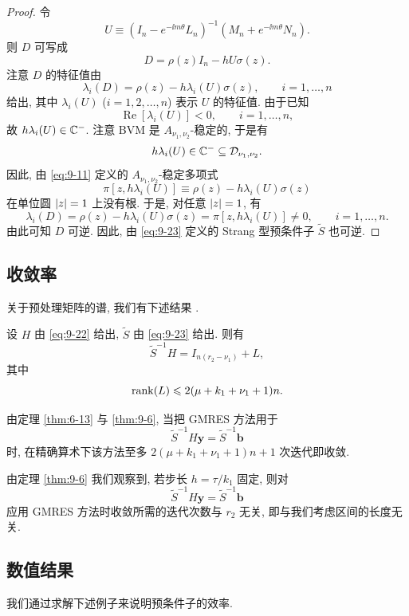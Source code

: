 \begin{proof}
令
\[
  U\equiv(I_n-e^{-\ii m\theta}L_n)^{-1}(M_n+e^{-\ii m\theta}N_n).
\]
则 $D$ 可写成
\[
  D=\rho(z)I_n-hU\sigma(z).
\]
注意 $D$ 的特征值由
\[
  \lambda_i(D)=\rho(z)-h\lambda_i(U)\sigma(z),\qquad i=1,\ldots,n
\]
给出, 其中 $\lambda_i(U)$ ($i=1,2,\ldots,n$) 表示 $U$ 的特征值. 由于已知
\[
  \operatorname{Re}[\lambda_i(U)]<0,\qquad i=1,\ldots,n,
\]
故 $h\lambda_i(U)\in\mathbb{C}^-$. 注意 BVM 是 $A_{\nu_1,\nu_2}$-稳定的, 于是有
\[
  h\lambda_i(U)\in\mathbb{C}^-\subseteq\mathcal{D}_{\nu_1,\nu_2}.
\]
因此, 由 \eqref{eq:9-11} 定义的 $A_{\nu_1,\nu_2}$-稳定多项式
\[
  \pi[z,h\lambda_i(U)]\equiv\rho(z)-h\lambda_i(U)\sigma(z)
\]
在单位圆 $\left|z\right|=1$ 上没有根. 于是, 对任意 $\left|z\right|=1$, 有
\[
  \lambda_i(D)=\rho(z)-h\lambda_i(U)\sigma(z)=\pi[z,h\lambda_i(U)]\neq0,
  \qquad i=1,\ldots,n.
\]
由此可知 $D$ 可逆. 因此, 由 \eqref{eq:9-23} 定义的 Strang 型预条件子 $\widetilde{S}$ 也可逆.
\end{proof}

\subsection{收敛率}
\label{sec:9-5-3}

关于预处理矩阵的谱, 我们有下述结果 \cite{src:5}.

\begin{theorem}
\label{thm:9-6}
设 $H$ 由 \eqref{eq:9-22} 给出, $\widetilde{S}$ 由 \eqref{eq:9-23} 给出. 则有
\[
  \widetilde{S}^{-1}H=I_{n(r_2-\nu_1)}+L,
\]
其中
\[
  \operatorname{rank}(L)\leqslant2(\mu+k_1+\nu_1+1)n.
\]
\end{theorem}

由定理 \ref{thm:6-13} 与 \ref{thm:9-6}, 当把 GMRES 方法用于
\[
  \widetilde{S}^{-1}H\mathbf{y}=\widetilde{S}^{-1}\mathbf{b}
\]
时, 在精确算术下该方法至多 $2(\mu+k_1+\nu_1+1)n+1$ 次迭代即收敛.

由定理 \ref{thm:9-6} 我们观察到, 若步长 $h=\tau/k_1$ 固定, 则对
\[
  \widetilde{S}^{-1}H\mathbf{y}=\widetilde{S}^{-1}\mathbf{b}
\]
应用 GMRES 方法时收敛所需的迭代次数与 $r_2$ 无关, 即与我们考虑区间的长度无关.

\subsection{数值结果}
\label{sec:9-5-4}

我们通过求解下述例子来说明预条件子的效率.

